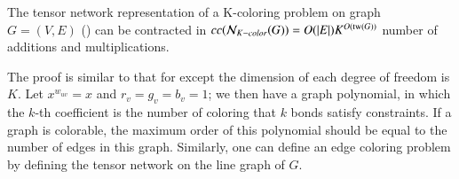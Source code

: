\documentclass[review, onefignum, onetabnum]{siamart190516}
\begin{document}
\begin{theorem}\label{thm:cutcomplex}
    The tensor network representation of a K-coloring problem on graph $G=(V,E)$ () can be contracted in $cc(\mathcal{N}_{K-color}(G)) = O(|E|)K^{O({\rm tw}(G))}$ number of additions and multiplications.
\end{theorem}
The proof is similar to that for  except the dimension of each degree of freedom is $K$.
Let $x^{w_{uv}} = x$ and $r_v = g_v = b_v = 1$; we then have a graph polynomial,
in which the $k$-th coefficient is the number of coloring that $k$ bonds satisfy constraints.
If a graph is colorable, the maximum order of this polynomial should be equal to the number of edges in this graph.
Similarly, one can define an edge coloring problem by defining the tensor network on the line graph of $G$.
\end{document}
